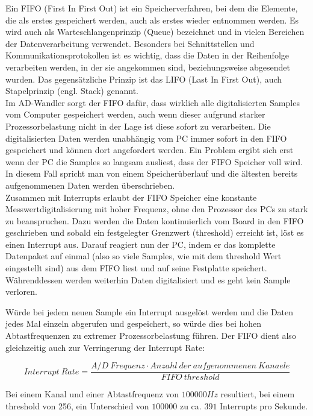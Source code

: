 \documentclass[12pt,a4paper,twoside,BCOR=12.5mm]{scrartcl}
\begin{document}
Ein FIFO (First In First Out) ist ein Speicherverfahren, bei dem die Elemente, die als erstes gespeichert werden, auch als erstes wieder entnommen werden. Es wird auch als Warteschlangenprinzip (Queue) bezeichnet und in vielen Bereichen der Datenverarbeitung verwendet. Besonders bei Schnittstellen und Kommunikationsprotokollen ist es wichtig, dass die Daten in der Reihenfolge verarbeiten werden, in der sie angekommen sind, beziehungsweise abgesendet wurden. Das gegensätzliche Prinzip ist das LIFO (Last In First Out), auch Stapelprinzip (engl. Stack) genannt.\\

Im AD-Wandler sorgt der FIFO dafür, dass wirklich alle digitalisierten Samples vom Computer gespeichert werden, auch wenn dieser aufgrund starker Prozessorbelastung nicht in der Lage ist diese sofort zu verarbeiten. Die digitalisierten Daten werden unabhängig vom PC immer sofort in den FIFO gespeichert und können dort angefordert werden. Ein Problem ergibt sich erst wenn der PC die Samples so langsam ausliest, dass der FIFO Speicher voll wird. In diesem Fall spricht man von einem Speicherüberlauf und die ältesten bereits aufgenommenen Daten werden überschrieben.\\


Zusammen mit Interrupts erlaubt der FIFO Speicher eine konstante Messwertdigitalisierung mit hoher Frequenz, ohne den Prozessor des PCs zu stark zu beanspruchen. Dazu werden die Daten kontinuierlich vom Board in den FIFO geschrieben und sobald ein festgelegter Grenzwert (threshold) erreicht ist, löst es einen Interrupt aus. Darauf reagiert nun der PC, indem er das komplette Datenpaket auf einmal (also so viele Samples, wie mit dem threshold Wert eingestellt sind) aus dem FIFO liest und auf seine Festplatte speichert. Währenddessen werden weiterhin Daten digitalisiert und es geht kein Sample verloren.

Würde bei jedem neuen Sample ein Interrupt ausgelöst werden und die Daten jedes Mal einzeln abgerufen und gespeichert, so würde dies bei hohen Abtastfrequenzen zu extremer Prozessorbelastung führen. Der FIFO dient also gleichzeitig auch zur Verringerung der Interrupt Rate:

\begin{equation}
Interrupt ~Rate = \frac{A/D ~Frequenz \cdot Anzahl ~der ~aufgenommenen ~Kanaele}{FIFO ~threshold}
\end{equation}

Bei einem Kanal und einer Abtastfrequenz von $100000 Hz$ resultiert, bei einem threshold von 256, ein Unterschied von $100000$ zu ca. $391$ Interrupts pro Sekunde.
\end{document}
